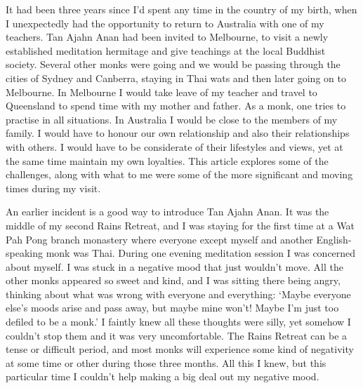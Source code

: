 
It had been three years since I'd spent any time in the country of my
birth, when I unexpectedly had the opportunity to return to Australia
with one of my teachers. Tan Ajahn Anan had been invited to Melbourne, 
to visit a newly established meditation hermitage and give teachings at
the local Buddhist society. Several other monks were going and we would
be passing through the cities of Sydney and Canberra, staying in Thai
wats and then later going on to Melbourne. In Melbourne I would take
leave of my teacher and travel to Queensland to spend time with my
mother and father. As a monk, one tries to practise in all situations. 
In Australia I would be close to the members of my family. I would have
to honour our own relationship and also their relationships with others. 
I would have to be considerate of their lifestyles and views, yet at the
same time maintain my own loyalties. This article explores some of the
challenges, along with what to me were some of the more significant and
moving times during my visit. 

An earlier incident is a good way to introduce Tan Ajahn Anan. It was
the middle of my second Rains Retreat, and I was staying for the first
time at a Wat Pah Pong branch monastery where everyone except myself and
another English-speaking monk was Thai. During one evening meditation
session I was concerned about myself. I was stuck in a negative mood
that just wouldn't move. All the other monks appeared so sweet and kind, 
and I was sitting there being angry, thinking about what was wrong with
everyone and everything: `Maybe everyone else's moods arise and pass
away, but maybe mine won't! Maybe I'm just too defiled to be a monk.' I
faintly knew all these thoughts were silly, yet somehow I couldn't stop
them and it was very uncomfortable. The Rains Retreat can be a tense or
difficult period, and most monks will experience some kind of negativity
at some time or other during those three months. All this I knew, but
this particular time I couldn't help making a big deal out my negative
mood. 

